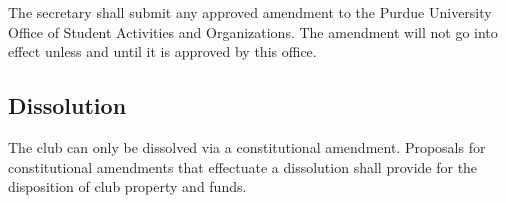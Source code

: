 \documentclass{article}
\begin{document}
The secretary shall submit any approved amendment to the Purdue University
Office of Student Activities and Organizations. The amendment will not go into
effect unless and until it is approved by this office.

\subsection{Dissolution}

The club can only be dissolved via a constitutional amendment. Proposals for
constitutional amendments that effectuate a dissolution shall provide for the
disposition of club property and funds.





\end{document}
